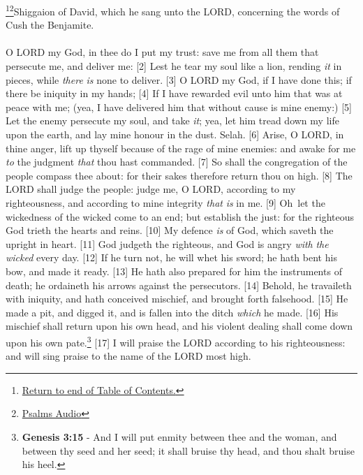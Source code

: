 \footnote{\textcolor[cmyk]{0.99998,1,0,0}{\hyperlink{TOC}{Return to end of Table of Contents.}}}\footnote{\href{https://audiobible.com/bible/bible.html}{\textcolor[cmyk]{0.99998,1,0,0}{Psalms Audio}}}\textcolor[cmyk]{0.99998,1,0,0}{Shiggaion of David, which he sang unto the LORD, concerning the words of Cush the Benjamite.}\\
\\
\textcolor[cmyk]{0.99998,1,0,0}{O LORD my God, in thee do I put my trust: save me from all them that persecute me, and deliver me:}
[2] \textcolor[cmyk]{0.99998,1,0,0}{Lest he tear my soul like a lion, rending \emph{it} in pieces, while \emph{there} \emph{is} none to deliver.}
[3] \textcolor[cmyk]{0.99998,1,0,0}{O LORD my God, if I have done this; if there be iniquity in my hands;}
[4] \textcolor[cmyk]{0.99998,1,0,0}{If I have rewarded evil unto him that was at peace with me; (yea, I have delivered him that without cause is mine enemy:)}
[5] \textcolor[cmyk]{0.99998,1,0,0}{Let the enemy persecute my soul, and take \emph{it}; yea, let him tread down my life upon the earth, and lay mine honour in the dust. Selah.}
[6] \textcolor[cmyk]{0.99998,1,0,0}{Arise, O LORD, in thine anger, lift up thyself because of the rage of mine enemies: and awake for me \emph{to} the judgment \emph{that} thou hast commanded.}
[7] \textcolor[cmyk]{0.99998,1,0,0}{So shall the congregation of the people compass thee about: for their sakes therefore return thou on high.}
[8] \textcolor[cmyk]{0.99998,1,0,0}{The LORD shall judge the people: judge me, O LORD, according to my righteousness, and according to mine integrity \emph{that} \emph{is} in me.}
[9] \textcolor[cmyk]{0.99998,1,0,0}{Oh\ let the wickedness of the wicked come to an end; but establish the just: for the righteous God trieth the hearts and reins.}
[10] \textcolor[cmyk]{0.99998,1,0,0}{My defence \emph{is} of God, which saveth the upright in heart.}
[11] \textcolor[cmyk]{0.99998,1,0,0}{God judgeth the righteous, and God is angry \emph{with} \emph{the} \emph{wicked} every day.}
[12] \textcolor[cmyk]{0.99998,1,0,0}{If he turn not, he will whet his sword; he hath bent his bow, and made it ready.}
[13] \textcolor[cmyk]{0.99998,1,0,0}{He hath also prepared for him the instruments of death; he ordaineth his arrows against the persecutors.}
[14] \textcolor[cmyk]{0.99998,1,0,0}{Behold, he travaileth with iniquity, and hath conceived mischief, and brought forth falsehood.}
[15] \textcolor[cmyk]{0.99998,1,0,0}{He made a pit, and digged it, and is fallen into the ditch \emph{which} he made.}
[16] \textcolor[cmyk]{0.99998,1,0,0}{His mischief shall return upon his own head, and his violent dealing shall come down upon his own pate.}\footnote{\textbf{Genesis 3:15} - And I will put enmity between thee and the woman, and between thy seed and her seed; it shall bruise thy head, and thou shalt bruise his heel.}
[17] \textcolor[cmyk]{0.99998,1,0,0}{I will praise the LORD according to his righteousness: and will sing praise to the name of the LORD most high.}

